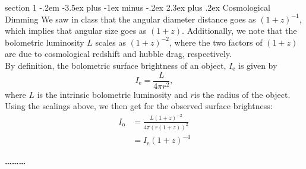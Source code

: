 \documentclass[12pt]{article}
\makeatletter
\newenvironment{problem}{\@startsection
	{section}
	{1}
	{-.2em}
	{-3.5ex plus -1ex minus -.2ex}
	{2.3ex plus .2ex}
	{\pagebreak[3]%
		\large\bf\noindent{Problem }
	}
}
{%
	\begin{center}\large\bf \ldots\ldots\ldots\end{center}}
\makeatother
\begin{document}
	\begin{problem}{Cosmological Dimming}
		We saw in class that the angular diameter distance goes as $(1+z)^{-1}$, which implies that angular size goes as $(1+z)$. Additionally, we note that the bolometric luminosity $L$ scales as $(1+z)^{-2}$, where the two factors of $(1+z)$ are due to cosmological redshift and hubble drag, respectively.\\
		
		By definition, the bolometric surface brightness of an object, $I_\mathrm{e}$ is given by \begin{equation*}
			I_\mathrm{e} = \frac{L}{4\pi r^2},
		\end{equation*} where $L$ is the intrinsic bolometric luminosity and $r$is the radius of the object.  Using the scalings above, we then get for the observed surface brightness: \begin{align*}
			I_\mathrm{o} &= \frac{L (1+z)^{-2} }{4\pi \left(r(1 + z)\right)^2}
			\\
			&= I_\mathrm{e} (1+z)^{-4}
		\end{align*}
		
	\end{problem}



% 
\end{document}
